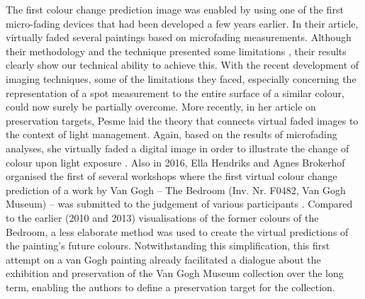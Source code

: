 The first colour change prediction image was enabled by using one of the first micro-fading devices that had been developed a few years earlier. In their article, \citet{morris_virtual_2007} virtually faded several paintings based on microfading measurements. Although their methodology and the technique presented some limitations \citep[224]{morris_virtual_2007}, their results clearly show our technical ability to achieve this. With the recent development of imaging techniques, some of the limitations they faced, especially concerning the representation of a spot measurement to the entire surface of a similar colour, could now surely be partially overcome. More recently, in her article on preservation targets, Pesme laid the theory that connects virtual faded images to the context of light management. Again, based on the results of microfading analyses, she virtually faded a digital image in order to illustrate the change of colour upon light exposure \citep[Figure 4]{pesme_presentation_2016}. Also in 2016, Ella Hendriks and Agnes Brokerhof organised the first of several workshops where the first virtual colour change prediction of a work by Van Gogh – The Bedroom (Inv. Nr. F0482, Van Gogh Museum) – was submitted to the judgement of various participants \citep[3, Figure 3]{hendriks_valuing_2017}. Compared to the earlier (2010 and 2013) visualisations of the former colours of the Bedroom, a less elaborate method was used to create the  virtual predictions of the painting’s future colours. Notwithstanding this simplification,  this first attempt on a van Gogh painting already facilitated a dialogue about the exhibition and preservation of the Van Gogh Museum collection over the long term, enabling the authors to define a preservation target for the collection. \\

